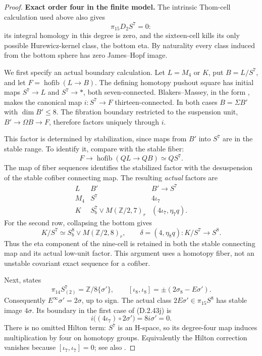 \begin{proof}
\medskip\noindent
\textbf{Exact order four in the finite model.}
The intrinsic Thom-cell calculation used above also gives
\[
 \pi_{15}D_2S^7=0:
 \tag{D.2.43i}
\]
its integral homology in this degree is zero, and the
sixteen-cell kills its only possible Hurewicz-kernel class,
the bottom eta. By naturality every class induced from
the bottom sphere has zero James--Hopf image.

We first specify an actual boundary calculation.
Let $L=M_4$ or $K$, put $B=L/S^7$, and let
$F=\operatorname{hofib}(L\to B)$. The defining homotopy
pushout square has initial maps $S^7\to L$ and $S^7\to *$,
both seven-connected. Blakers--Massey, in the form
\cite[Section~2, p.~309, and Theorem~2.3, p.~310]{FGHGoodwillie1992},
makes the canonical map $i:S^7\to F$ thirteen-connected.
In both cases $B=\Sigma B'$ with $\dim B'\leq8$. The
fibration boundary restricted to the suspension unit,
$B'\to\Omega B\to F$, therefore factors uniquely through $i$.

This factor is determined by stabilization, since maps
from $B'$ into $S^7$ are in the stable range. To identify it,
compare with the stable fiber:
\[
 F\longrightarrow\operatorname{hofib}(QL\to QB)
       \simeq QS^7.
\]
The map of fiber sequences identifies the stabilized factor
with the desuspension of the stable cofiber connecting map.
The resulting \emph{actual} factors are
\[
 \begin{array}{c|c|c}
 L&B'&B'\longrightarrow S^7\\ \hline
 M_4&S^7&4\iota_7\\
 K&S^7_b\vee M(\mathbb Z/2,7)_r&(4\iota_7,\eta_7q).
 \end{array}
 \tag{D.2.43j}
\]
For the second row, collapsing the bottom gives
\[
 K/S^7\simeq S^8_b\vee M(\mathbb Z/2,8)_r,\qquad
 \delta=(4,\eta_8q):K/S^7\longrightarrow S^8.
 \tag{D.2.43k}
\]
Thus the eta component of the nine-cell is retained in both
the stable connecting map and its actual low-unit factor.
This argument uses a homotopy fiber, not an unstable
covariant exact sequence for a cofiber.

Next, \cite[Introduction, p.~515]{EH5MorisugiMukai2000}
states
\[
 \pi_{14}S^7_{(2)}=\mathbb Z/8\{\sigma'\},\qquad
 [\iota_8,\iota_8]=\pm(2\sigma_8-E\sigma').
 \tag{D.2.43l}
\]
Consequently $E^\infty\sigma'=2\sigma$, up to sign.
The actual class $2E\sigma'\in\pi_{15}S^8$ has stable
image $4\sigma$. Its boundary in the first case of
\textup{(D.2.43j)} is
\[
 i\bigl((4\iota_7)\circ2\sigma'\bigr)=8i\sigma'=0.
 \tag{D.2.43m}
\]
There is no omitted Hilton term: $S^7$ is an H-space,
so its degree-four map induces multiplication by four
on homotopy groups. Equivalently the Hilton correction
vanishes because $[\iota_7,\iota_7]=0$; see also
\cite[Lemma~1.1]{EH5MorisugiMukai2000}.


\end{proof}

